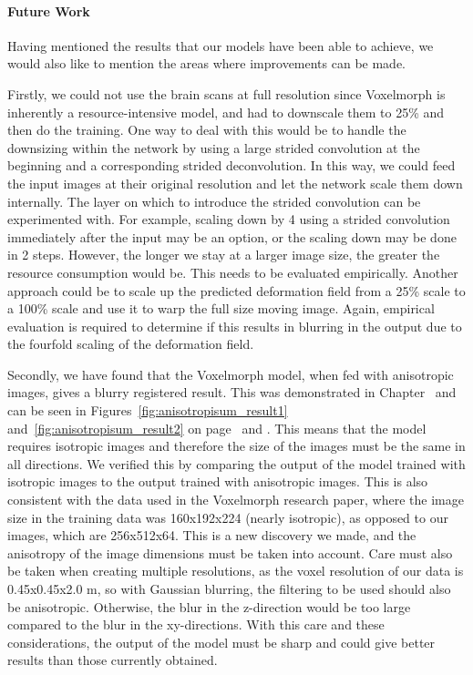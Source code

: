 \documentclass{book}
\begin{document}
	\paragraph{Future Work}
	Having mentioned the results that our models have been able to achieve, we would also like to mention the areas where improvements can be made.
	
	Firstly, we could not use the brain scans at full resolution since Voxelmorph is inherently a resource-intensive model, and had to downscale them to 25\% and then do the training. One way to deal with this would be to handle the downsizing within the network by using a large strided convolution at the beginning and a corresponding strided deconvolution. In this way, we could feed the input images at their original resolution and let the network scale them down internally. The layer on which to introduce the strided convolution can be experimented with. For example, scaling down by 4 using a strided convolution immediately after the input may be an option, or the scaling down may be done in 2 steps. However, the longer we stay at a larger image size, the greater the resource consumption would be. This needs to be evaluated empirically. Another approach could be to scale up the predicted deformation field from a 25\% scale to a 100\% scale and use it to warp the full size moving image. Again, empirical evaluation is required to determine if this results in blurring in the output due to the fourfold scaling of the deformation field.
	
	Secondly, we have found that the Voxelmorph model, when fed with anisotropic images, gives a blurry registered result. This was demonstrated in Chapter~ and can be seen in Figures~\ref{fig:anisotropisum_result1} and~\ref{fig:anisotropisum_result2} on page~\pageref{fig:anisotropisum_result1} and \pageref{fig:anisotropisum_result2}. This means that the model requires isotropic images and therefore the size of the images must be the same in all directions. We verified this by comparing the output of the model trained with isotropic images to the output trained with anisotropic images. This is also consistent with the data used in the Voxelmorph research paper, where the image size in the training data was 160x192x224 (nearly isotropic), as opposed to our images, which are 256x512x64. This is a new discovery we made, and the anisotropy of the image dimensions must be taken into account. Care must also be taken when creating multiple resolutions, as the voxel resolution of our data is 0.45x0.45x2.0 \textmu m, so with Gaussian blurring, the filtering to be used should also be anisotropic. Otherwise, the blur in the z-direction would be too large compared to the blur in the xy-directions. With this care and these considerations, the output of the model must be sharp and could give better results than those currently obtained.
	
	\newpage
	\listoffigures %
	\listoftables
	\lstlistoflistings %
	
	\begin{appendix}
		
		\cleardoublepage
	\end{appendix}
	
	
	
\end{document}

